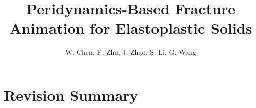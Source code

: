

\title[Peridynamics-Based Fracture Animation for Elastoplastic Solids]%
      {Peridynamics-Based Fracture Animation for Elastoplastic Solids}

\author[W. Chen et al.]{W. Chen, F. Zhu, J. Zhao,
  S. Li, G. Wang}



%



\maketitle

\section{Revision Summary}

